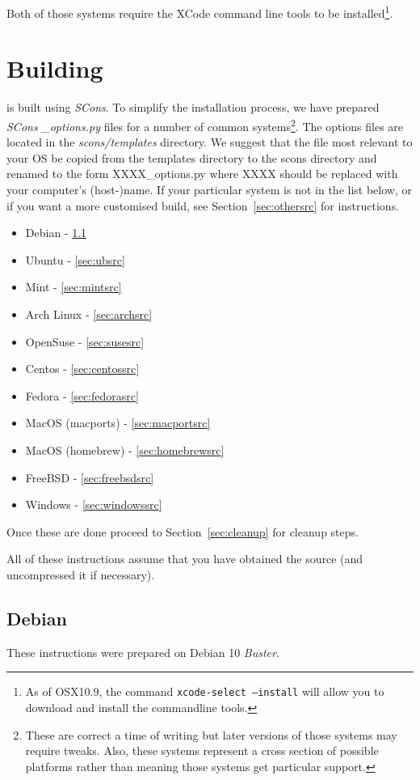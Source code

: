 \documentclass{esysdoc}
\begin{document}
\noindent Both of those systems require the XCode command line tools to be installed\footnote{As of OSX10.9, the
command \texttt{xcode-select --install} will allow you to download and install the commandline tools.}.

\section{Building}\label{sec:build}

\esfinley is built using \textit{SCons}. To simplify the installation process, we have prepared \textit{SCons} \textit{_options.py} files for a number of common systems\footnote{These are correct a time of writing but later versions of those systems may require tweaks.
Also, these systems represent a cross section of possible platforms rather than meaning those systems get particular support.}.
The options files are located in the \textit{scons/templates} directory. We suggest that the file most relevant to your OS
be copied from the templates directory to the scons directory and renamed to the form XXXX_options.py where XXXX
should be replaced with your computer's (host-)name.
If your particular system is not in the list below, or if you want a more customised
build,
see Section~\ref{sec:othersrc} for instructions.
\begin{itemize}
 \item Debian - \ref{sec:debsrc}
 \item Ubuntu - \ref{sec:ubsrc}
 \item Mint - \ref{sec:mintsrc}
 \item Arch Linux - \ref{sec:archsrc}
 \item OpenSuse - \ref{sec:susesrc}
 \item Centos - \ref{sec:centossrc}
 \item Fedora - \ref{sec:fedorasrc}
 \item MacOS (macports) - \ref{sec:macportsrc}
 \item MacOS (homebrew) - \ref{sec:homebrewsrc}
 \item FreeBSD - \ref{sec:freebsdsrc}
 \item Windows - \ref{sec:windowssrc}
\end{itemize}

Once these are done proceed to Section~\ref{sec:cleanup} for cleanup steps.

\noindent All of these instructions assume that you have obtained the \escript source (and uncompressed it if necessary).
\subsection{Debian}\label{sec:debsrc}
\noindent These instructions were prepared on Debian 10 \textit{Buster}.
\end{document}
